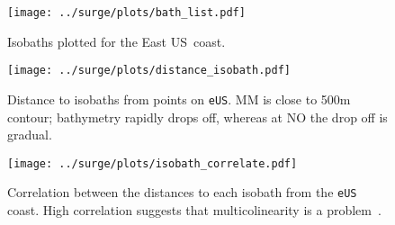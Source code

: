 
\begin{figure}[htb!]
\texttt{[image: ../surge/plots/bath\_list.pdf]}
\vspace{-25pt}

\caption{Isobaths plotted for the East US~coast.}
\label{fig:bath}
\texttt{[image: ../surge/plots/distance\_isobath.pdf]}
\vspace{-25pt}

\caption{Distance to isobaths from points on \texttt{eUS}. MM is close to 500m
contour; bathymetry rapidly drops off, whereas at NO the drop off is gradual.}
\label{fig:isobath}
\texttt{[image: ../surge/plots/isobath\_correlate.pdf]}
\vspace{-25pt}

\caption{Correlation between the distances to each isobath from
the \texttt{eUS} coast. High correlation
suggests that multicolinearity is a problem~\cite{faul2019concise}.}
\label{fig:corr_isobath}
\end{figure}
